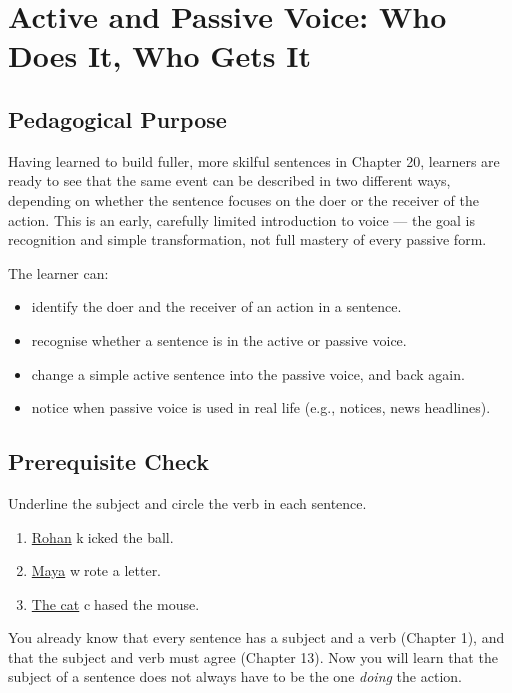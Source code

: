 
\chapter{Active and Passive Voice: Who Does It, Who Gets It}

\section{Pedagogical Purpose}
Having learned to build fuller, more skilful sentences in Chapter 20, learners are ready to see that the same event can be described in two different ways, depending on whether the sentence focuses on the doer or the receiver of the action. This is an early, carefully limited introduction to voice — the goal is recognition and simple transformation, not full mastery of every passive form.

\begin{learningobjectives}
The learner can:
\begin{itemize}
    \item identify the doer and the receiver of an action in a sentence.
    \item recognise whether a sentence is in the active or passive voice.
    \item change a simple active sentence into the passive voice, and back again.
    \item notice when passive voice is used in real life (e.g., notices, news headlines).
\end{itemize}
\end{learningobjectives}

\section{Prerequisite Check}
\begin{quickcheck}
Underline the subject and circle the verb in each sentence.
\begin{enumerate}
    \item \underline{Rohan} \textcircled{kicked} the ball.
    \item \underline{Maya} \textcircled{wrote} a letter.
    \item \underline{The cat} \textcircled{chased} the mouse.
\end{enumerate}
\end{quickcheck}

\begin{rememberbox}
You already know that every sentence has a subject and a verb (Chapter 1), and that the subject and verb must agree (Chapter 13). Now you will learn that the subject of a sentence does not always have to be the one \textit{doing} the action.
\end{rememberbox}

